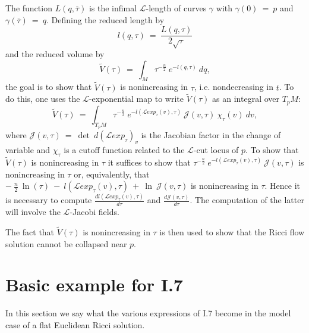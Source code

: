 \documentclass[12pt]{amsart}
\numberwithin{equation}{section}
\theoremstyle{plain}
\theoremstyle{definition}
\theoremstyle{remark}
\begin{document}
The function $L(q, \overline{\tau})$ is the infimal ${\mathcal L}$-length of
curves $\gamma$ with $\gamma(0) \: = \: p$ and $\gamma(\overline{\tau}) 
\: = \: q$. Defining the reduced length by 
\begin{equation} \label{reducedl}
l(q, {\tau}) \: = \: \frac{L(q, \tau)}{2 \sqrt{\tau}}
\end{equation}
and the reduced volume by
\begin{equation} \label{reducedv}
\tilde{V}(\tau) \: = \: \int_M \tau^{-\frac{n}{2}} \: e^{-l(q, \tau)} \:
dq, 
\end{equation}
the goal is to show that $\tilde{V}(\tau)$ is
nonincreasing in $\tau$, i.e. nondecreasing in $t$.
To do this, one uses the ${\mathcal L}$-exponential map to
write $\tilde{V}(\tau)$ as an integral over $T_pM$:
\begin{equation}
\tilde{V}(\tau) \: = \: \int_{T_pM} \tau^{-\frac{n}{2}} \: 
e^{-l({\mathcal L}exp_\tau(v), \tau)} \: {\mathcal J}(v, \tau) \: 
\chi_{\tau}(v) \:
dv,
\end{equation} 
where ${\mathcal J}(v, \tau) \: = \:
\det \: d\left( {\mathcal L}exp_\tau \right)_v$ is the Jacobian factor
in the change of variable and 
$\chi_\tau$ is a cutoff function related to the
${\mathcal L}$-cut locus of $p$.
To show that $\tilde{V}(\tau)$ is
nonincreasing in $\tau$ it suffices to show that
$\tau^{-\frac{n}{2}} \: 
e^{-l({\mathcal L}exp_\tau(v), \tau)} 
\: {\mathcal J}(v, \tau)$ is nonincreasing
in $\tau$ or, equivalently, that $- \: \frac{n}{2} \: \ln(\tau) \:
- \: l({\mathcal L}exp_\tau(v), \tau) \: + \: \ln \:{\mathcal J}(v, \tau)$ is
nonincreasing in $\tau$. Hence it is necessary to compute
$\frac{dl({\mathcal L}exp_\tau(v), \tau)}{d\tau}$  and
$\frac{d{\mathcal J}(v, \tau)}{d\tau}$. The
computation of the latter will involve the ${\mathcal L}$-Jacobi fields.

The fact that $\tilde{V}(\tau)$ is
nonincreasing in $\tau$ is then used to show that the Ricci flow
solution cannot be  collapsed near $p$.

\section{Basic example for I.7} \label{7Euclidean}
 
 In this section we say what the various expressions of I.7 become in
 the model case of a flat Euclidean Ricci solution.
 
\end{document}
